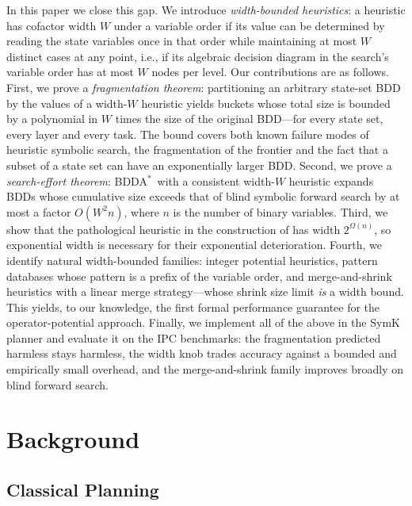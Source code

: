\documentclass[letterpaper]{article}
\newcommand{\bddastar}{BDDA\ensuremath{^{*}}}
\theoremstyle{plain}
\theoremstyle{definition}
\theoremstyle{remark}
\begin{document}
In this paper we close this gap. We introduce \emph{width-bounded
heuristics}: a heuristic has cofactor width $W$ under a variable order
if its value can be determined by reading the state variables once in
that order while maintaining at most $W$ distinct cases at any point,
i.e., if its algebraic decision diagram in the search's variable order
has at most $W$ nodes per level. Our contributions are as follows.
First, we prove a \emph{fragmentation theorem}: partitioning an arbitrary
state-set BDD by the values of a width-$W$ heuristic yields buckets whose
total size is bounded by a polynomial in $W$ times the size of the
original BDD---for every state set, every layer and every task. The bound
covers both known failure modes of heuristic symbolic search, the
fragmentation of the frontier and the fact that a subset of a state set
can have an exponentially larger BDD. Second, we prove a
\emph{search-effort theorem}: \bddastar\ with a consistent width-$W$
heuristic expands BDDs whose cumulative size exceeds that of blind
symbolic forward search by at most a factor $O(W^{2}n)$, where $n$ is
the number of binary variables. Third, we show that the pathological
heuristic in the construction of \citet{speck-et-al-icaps2020} has width
$2^{\Omega(n)}$, so exponential width is necessary for their exponential
deterioration. Fourth, we identify natural width-bounded families:
integer potential heuristics, pattern databases whose pattern is a prefix
of the variable order, and merge-and-shrink heuristics with a linear
merge strategy---whose shrink size limit \emph{is} a width bound. This
yields, to our knowledge, the first formal performance guarantee for the
operator-potential approach.
Finally, we implement all of the above in the SymK planner
\citep{speck-et-al-jair2025} and evaluate it on the IPC benchmarks: the
fragmentation predicted harmless stays harmless, the width knob trades
accuracy against a bounded and empirically small overhead, and the
merge-and-shrink family improves broadly on blind forward search.

\section{Background}

\subsection{Classical Planning}
\end{document}
